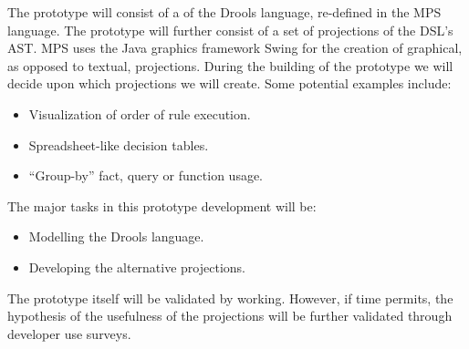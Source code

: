 The prototype will consist of a of the Drools language, re-defined in the MPS language.  
The prototype will further consist of a set of projections of the DSL's AST.
MPS uses the Java graphics framework Swing for the creation of graphical, as opposed to textual, projections.
During the building of the prototype we will decide upon which projections we will create. Some potential examples include:
\begin{itemize}
    \item Visualization of order of rule execution.
    \item Spreadsheet-like decision tables.
    \item ``Group-by'' fact, query or function usage.
\end{itemize}


The major tasks in this prototype development will be: 
\begin{itemize}
    \item Modelling the Drools language.
    \item Developing the alternative projections.
\end{itemize}

The prototype itself will be validated by working.
However, if time permits, the hypothesis of the usefulness of the projections will be further validated through developer use surveys.

